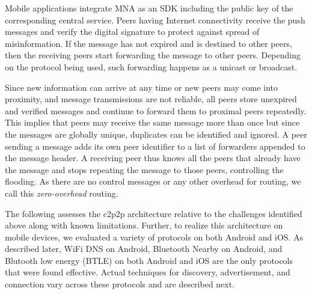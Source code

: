 \documentclass[conference]{IEEEtran}
\begin{document}
Mobile applications integrate MNA as an SDK including the public key
of the corresponding central service. Peers having Internet
connectivity receive the push messages and verify the digital
signature to protect against spread of misinformation.  If the message
has not expired and is destined to other peers, then the receiving
peers start forwarding the message to other peers. Depending on the
protocol being used, such forwarding happens as a unicast or
broadcast.

Since new information can arrive at any time or new peers may come
into proximity, and message transmissions are not reliable, all peers
store unexpired and verified messages and continue to forward them to
proximal peers repeatedly. This implies that peers may receive the
same message more than once but since the messages are globally
unique, duplicates can be identified and ignored.  A peer sending a
message adds its own peer identifier to a list of forwarders appended
to the message header.  A receiving peer thus knows all the peers that
already have the message and stops repeating the message to those
peers, controlling the flooding.  As there are no control messages or
any other overhead for routing, we call this \emph{zero-overhead}
routing.

The following assesses the c2p2p architecture relative to the
challenges identified above along with known limitations. Further, to
realize this architecture on mobile devices, we evaluated a variety of
protocols on both Android and iOS. As described later, WiFi DNS on
Android, Bluetooth Nearby on Android, and Blutooth low energy (BTLE)
on both Android and iOS are the only protocols that were found
effective. Actual techniques for discovery, advertisement, and
connection vary across these protocols and are described next.
%
\end{document}
